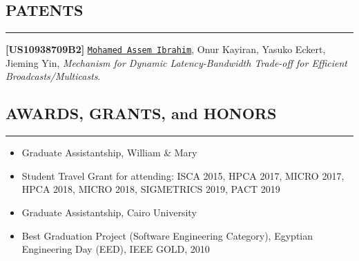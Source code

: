 \documentclass[10pt,a4]{article}
\begin{document}
\subsection*{PATENTS}
\hrule
\vspace{0.2cm}

\begin{description}

\item 
{\bf [US10938709B2]}
{\tt \underline{Mohamed Assem Ibrahim}}, Onur Kayiran, Yasuko Eckert, Jieming Yin,
{\it Mechanism for Dynamic Latency-Bandwidth Trade-off for Efficient Broadcasts/Multicasts}.

\end{description}

\subsection*{AWARDS, GRANTS, and HONORS}
\hrule
\vspace{0.2cm}
\begin{itemize}
\item Graduate Assistantship, William \& Mary
\item Student Travel Grant for attending: ISCA 2015, HPCA 2017, MICRO 2017, HPCA 2018, MICRO 2018, SIGMETRICS 2019, PACT 2019
\item Graduate Assistantship, Cairo University
\item Best Graduation Project (Software Engineering Category), Egyptian Engineering Day (EED), IEEE GOLD, 2010
\end{itemize}



\end{document}
